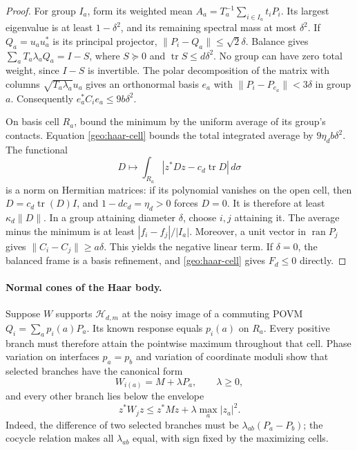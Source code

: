 \begin{proof}
For group \(I_a\), form its weighted mean
\(A_a=T_a^{-1}\sum_{i\in I_a}t_iP_i\). Its largest eigenvalue is
at least \(1-\delta^2\), and its remaining spectral mass at most
\(\delta^2\). If \(Q_a=u_au_a^*\) is its principal projector,
\(\|P_i-Q_a\|\le\sqrt2\delta\).
Balance gives
\(\sum_aT_a\lambda_aQ_a=I-S\), where \(S\succeq0\) and
\(\operatorname{tr}S\le d\delta^2\). No group can have zero total
weight, since \(I-S\) is invertible.
The polar decomposition of the matrix with columns
\(\sqrt{T_a\lambda_a}u_a\) gives an orthonormal basis \(e_a\)
with \(\|P_i-P_{e_a}\|<3\delta\) in group \(a\).
Consequently \(e_a^*C_ie_a\le9b\delta^2\).

On basis cell \(R_a\), bound the minimum by the uniform average of
its group's contacts. Equation \eqref{geo:haar-cell} bounds the
total integrated average by \(9\eta_db\delta^2\).
The functional
\[
 D\longmapsto\int_{R_a}
       |z^*Dz-c_d\operatorname{tr}D|\,d\sigma
\]
is a norm on Hermitian matrices: if its polynomial vanishes on the
open cell, then \(D=c_d\operatorname{tr}(D)I\), and
\(1-dc_d=\eta_d>0\) forces \(D=0\).
It is therefore at least \(\kappa_d\|D\|\).
In a group attaining diameter \(\delta\), choose \(i,j\) attaining it.
The average minus the minimum is at least \(|f_i-f_j|/|I_a|\).
Moreover, a unit vector in \(\operatorname{ran}P_j\) gives
\(\|C_i-C_j\|\ge a\delta\). This yields the negative linear term.
If \(\delta=0\), the balanced frame is a basis refinement, and
\eqref{geo:haar-cell} gives \(F_d\le0\) directly.
\end{proof}

\paragraph{Normal cones of the Haar body.}
Suppose \(W\) supports \(\mathcal H_{d,m}\) at the noisy image of a
commuting POVM \(Q_i=\sum_a p_i(a)P_a\).
Its known response equals \(p_i(a)\) on \(R_a\).
Every positive branch must therefore attain the pointwise maximum
throughout that cell. Phase variation on interfaces \(p_a=p_b\)
and variation of coordinate moduli show that selected branches have
the canonical form
\begin{equation}
 W_{i(a)}=M+\lambda P_a,\qquad \lambda\ge0,
 \label{geo:normal}
\end{equation}
and every other branch lies below the envelope
\[
 z^*W_jz\le z^*Mz+\lambda\max_a|z_a|^2.
 \label{geo:envelope}
\]
Indeed, the difference of two selected branches must be
\(\lambda_{ab}(P_a-P_b)\); the cocycle relation makes all
\(\lambda_{ab}\) equal, with sign fixed by the maximizing cells.

